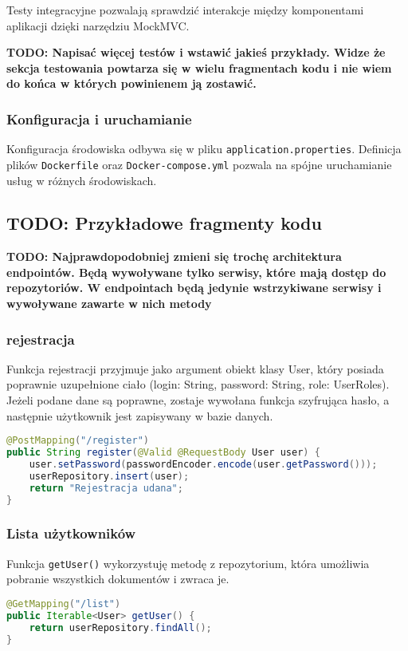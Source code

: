Testy integracyjne pozwalają sprawdzić interakcje między komponentami aplikacji dzięki narzędziu MockMVC.

\textbf{TODO: Napisać więcej testów i wstawić jakieś przykłady. Widze że sekcja testowania powtarza się w wielu fragmentach kodu i nie wiem do końca w których powinienem ją zostawić.}
\subsubsection*{Konfiguracja i uruchamianie}
Konfiguracja środowiska odbywa się w pliku \texttt{application.properties}. Definicja plików \texttt{Dockerfile} oraz \texttt{Docker-compose.yml} pozwala na spójne uruchamianie usług w różnych środowiskach.
\subsection*{TODO: Przykładowe fragmenty kodu}
\textbf{TODO: Najprawdopodobniej zmieni się trochę architektura endpointów. Będą wywoływane tylko serwisy, które mają dostęp do repozytoriów. W endpointach będą jedynie wstrzykiwane serwisy i wywoływane zawarte w nich metody}
\subsubsection*{rejestracja}
Funkcja rejestracji przyjmuje jako argument obiekt klasy User, który posiada poprawnie uzupełnione ciało (login: String, password: String, role: UserRoles). Jeżeli podane dane są poprawne, zostaje wywołana funkcja szyfrująca hasło, a następnie użytkownik jest zapisywany w bazie danych.
\begin{lstlisting}[language={Java}, caption={Rejestracja użytkownika}, label={lst:java-register}]
@PostMapping("/register")
public String register(@Valid @RequestBody User user) {
	user.setPassword(passwordEncoder.encode(user.getPassword()));
	userRepository.insert(user);
	return "Rejestracja udana";
}
\end{lstlisting}
\subsubsection*{Lista użytkowników}
Funkcja \texttt{getUser()} wykorzystuję metodę z repozytorium, która umożliwia pobranie wszystkich dokumentów i zwraca je.
\begin{lstlisting}[language={Java}, caption={Lista użytkowników}, label={lst:java-list}]
@GetMapping("/list")
public Iterable<User> getUser() {
	return userRepository.findAll();
}
\end{lstlisting}
